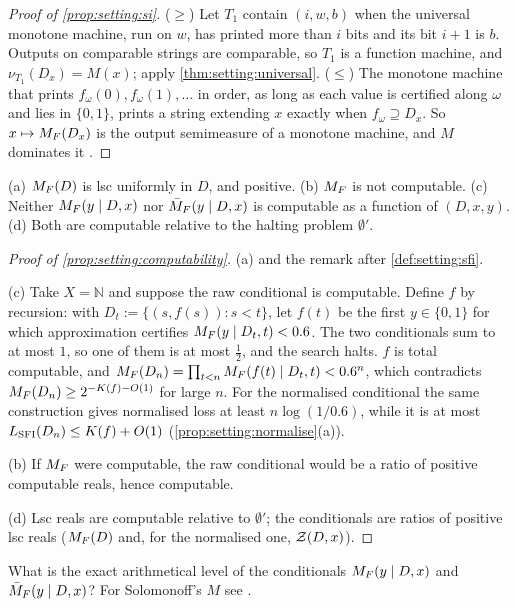 \begin{proof}[Proof of \cref{prop:setting:si}]
($\ge$) Let $T_1$ contain $(i,w,b)$ when the universal monotone machine, run on $w$, has printed more than $i$ bits and its bit $i+1$ is $b$. Outputs on comparable strings are comparable, so $T_1$ is a function machine, and $\nu_{T_1}(D_x)=M(x)$; apply \cref{thm:setting:universal}. ($\le$) The monotone machine that prints $f_\omega(0),f_\omega(1),\dots$ in order, as long as each value is certified along $\omega$ and lies in $\{0,1\}$, prints a string extending $x$ exactly when $f_\omega\supseteq D_x$. So $x\mapsto M_{F}(D_x)$ is the output semimeasure of a monotone machine, and $M$ dominates it \citep{zvonkin1970complexity}.
\end{proof}

\begin{proposition}[Computability]\label{prop:setting:computability}
(a) $M_{F}(D)$ is lsc uniformly in $D$, and positive. (b) $M_{F}$ is not computable. (c) Neither $M_{F}(y\mid D,x)$ nor $\bar{M}_{F}(y\mid D,x)$ is computable as a function of $(D,x,y)$. (d) Both are computable relative to the halting problem $\emptyset'$.
\end{proposition}

\begin{proof}[Proof of \cref{prop:setting:computability}]
(a)  and the remark after \cref{def:setting:sfi}.

(c) Take $X=\mathbb N$ and suppose the raw conditional is computable. Define $f$ by recursion: with $D_t:=\{(s,f(s)):s<t\}$, let $f(t)$ be the first $y\in\{0,1\}$ for which approximation certifies $M_{F}(y\mid D_t,t)<0.6$. The two conditionals sum to at most $1$, so one of them is at most $\frac12$, and the search halts. $f$ is total computable, and $M_{F}(D_n)=\prod_{t<n}M_{F}(f(t)\mid D_t,t)<0.6^n$, which contradicts $M_{F}(D_n)\ge2^{-K(f)-O(1)}$ for large $n$. For the normalised conditional the same construction gives normalised loss at least $n\log(1/0.6)$, while it is at most $L_{\mathrm{SFI}}(D_n)\le K(f)+O(1)$ (\cref{prop:setting:normalise}(a)).

(b) If $M_{F}$ were computable, the raw conditional would be a ratio of positive computable reals, hence computable.

(d) Lsc reals are computable relative to $\emptyset'$; the conditionals are ratios of positive lsc reals ($M_{F}(D)$ and, for the normalised one, $\mathcal{Z}(D,x)$).
\end{proof}

\begin{question}\label{q:setting:level}
What is the exact arithmetical level of the conditionals $M_{F}(y\mid D,x)$ and $\bar{M}_{F}(y\mid D,x)$? For Solomonoff's $M$ see \citet{leike2015computability}.
\end{question}
